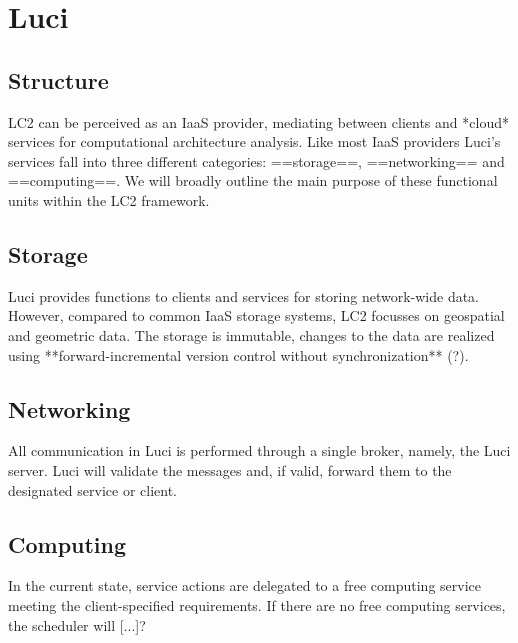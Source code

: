 \section{Luci}
\label{ch:luci}

\subsection{Structure}
\label{sec:luci:structure}
LC2 can be perceived as an IaaS provider, mediating between clients and *cloud* services for computational architecture analysis. Like most IaaS providers Luci's services fall into three different categories: ==storage==, ==networking== and ==computing==. We will broadly outline the main purpose of these functional units within the LC2 framework.

\subsection{Storage}
\label{sec:luci:structure:storage}
Luci provides functions to clients and services for storing network-wide data. However, compared to common IaaS storage systems, LC2 focusses on geospatial and geometric data. The storage is immutable, changes to the data are realized using **forward-incremental version control without synchronization** (?).

\subsection{Networking}
\label{sec:luci:structure:networking}
All communication in Luci is performed through a single broker, namely, the Luci server. Luci will validate the messages and, if valid, forward them to the designated service or client.

\subsection{Computing}
\label{sec:luci:structure:computing}
In the current state, service actions are delegated to a free computing service meeting the client-specified requirements. If there are no free computing services, the scheduler will [...]?

